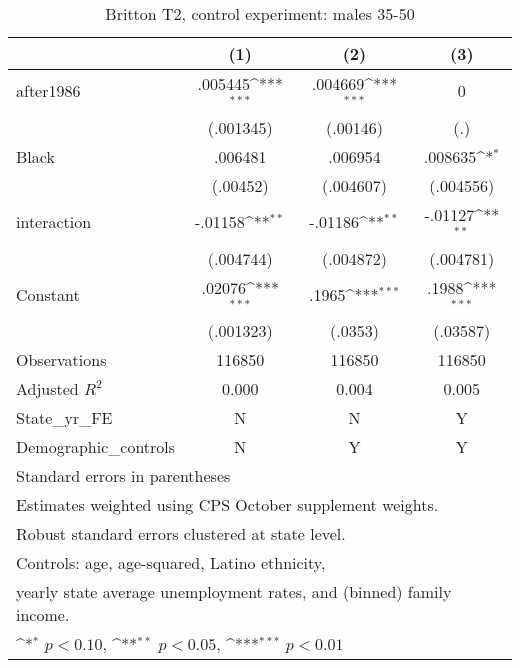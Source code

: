 \begin{table}[htbp]\centering
\def\sym#1{\ifmmode^{#1}\else\(^{#1}\)\fi}
\caption{Britton T2, control experiment: males 35-50}
\begin{tabular}{l*{3}{c}}
\hline\hline
                    &\multicolumn{1}{c}{(1)}         &\multicolumn{1}{c}{(2)}         &\multicolumn{1}{c}{(3)}         \\
\hline
after1986           &     .005445\sym{***}&     .004669\sym{***}&           0         \\
                    &   (.001345)         &    (.00146)         &         (.)         \\
[1em]
Black               &     .006481         &     .006954         &     .008635\sym{*}  \\
                    &    (.00452)         &   (.004607)         &   (.004556)         \\
[1em]
interaction         &     -.01158\sym{**} &     -.01186\sym{**} &     -.01127\sym{**} \\
                    &   (.004744)         &   (.004872)         &   (.004781)         \\
[1em]
Constant            &      .02076\sym{***}&       .1965\sym{***}&       .1988\sym{***}\\
                    &   (.001323)         &     (.0353)         &    (.03587)         \\
\hline
Observations        &      116850         &      116850         &      116850         \\
Adjusted \(R^{2}\)  &       0.000         &       0.004         &       0.005         \\
State\_yr\_FE         &           N         &           N         &           Y         \\
Demographic\_controls&           N         &           Y         &           Y         \\
\hline\hline
\multicolumn{4}{l}{\footnotesize Standard errors in parentheses}\\
\multicolumn{4}{l}{\footnotesize Estimates weighted using CPS October supplement weights.}\\
\multicolumn{4}{l}{\footnotesize Robust standard errors clustered at state level.}\\
\multicolumn{4}{l}{\footnotesize Controls: age, age-squared, Latino ethnicity,}\\
\multicolumn{4}{l}{\footnotesize yearly state average unemployment rates, and (binned) family income.}\\
\multicolumn{4}{l}{\footnotesize \sym{*} \(p<0.10\), \sym{**} \(p<0.05\), \sym{***} \(p<0.01\)}\\
\end{tabular}
\end{table}
